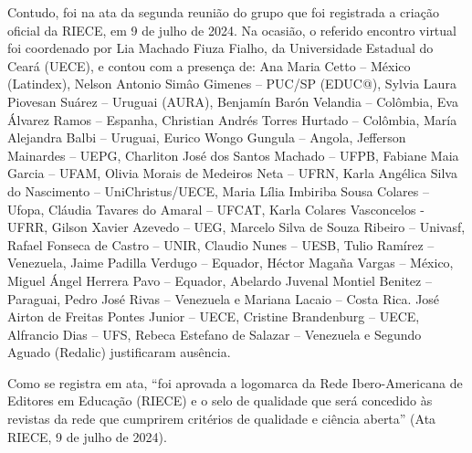 \documentclass[
  a4paper,
]{book}
\begin{document}
Contudo, foi na ata da segunda reunião do grupo que foi registrada a
criação oficial da RIECE, em 9 de julho de 2024. Na ocasião, o referido
encontro virtual foi coordenado por Lia Machado Fiuza Fialho, da
Universidade Estadual do Ceará (UECE), e contou com a presença de: Ana
Maria Cetto -- México (Latindex), Nelson Antonio Simâo Gimenes -- PUC/SP
(EDUC@), Sylvia Laura Piovesan Suárez -- Uruguai (AURA), Benjamín Barón
Velandia -- Colômbia, Eva Álvarez Ramos -- Espanha, Christian Andrés
Torres Hurtado -- Colômbia, María Alejandra Balbi -- Uruguai, Eurico
Wongo Gungula -- Angola, Jefferson Mainardes -- UEPG, Charliton José dos
Santos Machado -- UFPB, Fabiane Maia Garcia -- UFAM, Olivia Morais de
Medeiros Neta -- UFRN, Karla Angélica Silva do Nascimento --
UniChristus/UECE, Maria Lília Imbiriba Sousa Colares -- Ufopa, Cláudia
Tavares do Amaral -- UFCAT, Karla Colares Vasconcelos - UFRR, Gilson
Xavier Azevedo -- UEG, Marcelo Silva de Souza Ribeiro -- Univasf, Rafael
Fonseca de Castro -- UNIR, Claudio Nunes -- UESB, Tulio Ramírez --
Venezuela, Jaime Padilla Verdugo -- Equador, Héctor Magaña Vargas --
México, Miguel Ángel Herrera Pavo -- Equador, Abelardo Juvenal Montiel
Benitez -- Paraguai, Pedro José Rivas -- Venezuela e Mariana Lacaio --
Costa Rica. José Airton de Freitas Pontes Junior -- UECE, Cristine
Brandenburg -- UECE, Alfrancio Dias -- UFS, Rebeca Estefano de Salazar
-- Venezuela e Segundo Aguado (Redalic) justificaram ausência.

Como se registra em ata, ``foi aprovada a logomarca da Rede
Ibero-Americana de Editores em Educação (RIECE) e o selo de qualidade
que será concedido às revistas da rede que cumprirem critérios de
qualidade e ciência aberta'' (Ata RIECE, 9 de julho de 2024).
\end{document}
